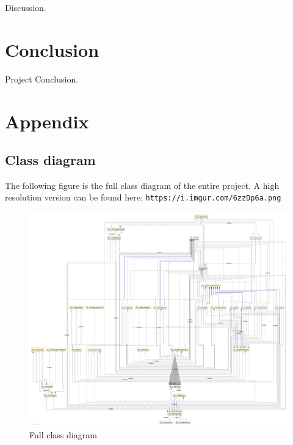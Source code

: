 \documentclass[12p]{article}
\begin{document}
Discussion.


\newpage
\section{Conclusion}

Project Conclusion.


\newpage
\printbibliography[heading=bibintoc,title={References}]


\newpage
\appendix

\section{Appendix}

\subsection{Class diagram} \label{AppendixClassDiagramFull}

The following figure is the full class diagram of the entire project. A high resolution version can be found here: \texttt{https://i.imgur.com/6zzDp6a.png}

\begin{figure}[ht]
  \centering
  \includegraphics[width=1\textwidth]{Documentation/class_diagram}
  \caption{Full class diagram}
  \label{fig:ClassDiagramFull}
\end{figure}
\end{document}
